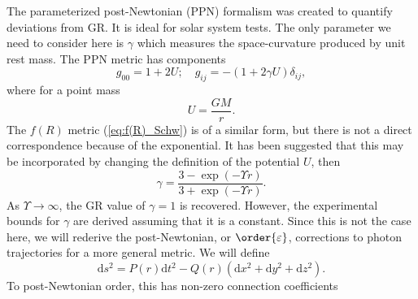 \documentclass[aps,prd,reprint,showpacs]{revtex4-1}
\newcommand{\eqnref}[1]{(\ref{eq:#1})}
\newcommand{\dd}{\ensuremath{\text{d}}}
\begin{document}
The parameterized post-Newtonian (PPN) formalism was created to quantify deviations from GR\cite{Will1993, Will2006}. It is ideal for solar system tests. The only parameter we need to consider here is $\gamma$ which measures the space-curvature produced by unit rest mass. The PPN metric has components
\begin{equation}
g_{00} = 1 + 2U; \quad g_{ij} = -(1 + 2\gamma U)\delta_{ij},
\end{equation}
where for a point mass
\begin{equation}
U = \frac{GM}{r}.
\end{equation}
The $f(R)$ metric \eqnref{f(R)_Schw} is of a similar form, but there is not a direct correspondence because of the exponential. It has been suggested that this may be incorporated by changing the definition of the potential $U$\cite{Olmo2007c, DeFelice2010}, then
\begin{equation}
\gamma = \frac{3 - \exp(-\Upsilon r)}{3 + \exp(-\Upsilon r)}.
\end{equation}
As $\Upsilon \rightarrow \infty$, the GR value of $\gamma = 1$ is recovered. However, the experimental bounds for $\gamma$ are derived assuming that it is a constant\cite{Will1993}. Since this is not the case here, we will rederive the post-Newtonian, or $\order{\varepsilon}$, corrections to photon trajectories for a more general metric. We will define
\begin{equation}
\dd s^2 = P(r)\dd t^2 - Q(r)\left(\dd x^2 + \dd y^2 + \dd z^2\right).
\end{equation}
To post-Newtonian order, this has non-zero connection coefficients
\end{document}
